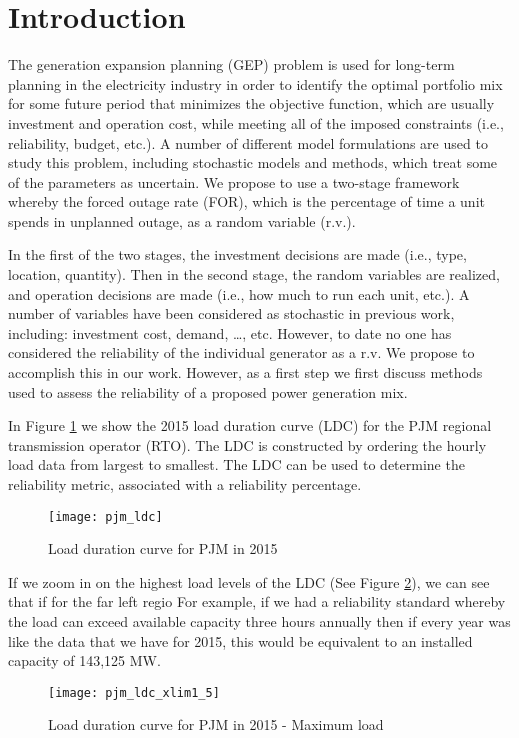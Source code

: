 \documentclass[10pt]{amsart}
\begin{document}
\section{Introduction}
The generation expansion planning (GEP) problem is used for long-term planning in the electricity industry in order to identify the optimal portfolio mix for some future period that minimizes the objective function, which are usually investment and operation cost, while meeting all of the imposed constraints (i.e., reliability, budget, etc.). 
A number of different model formulations are used to study this problem, including stochastic models and methods, which treat some of the parameters as uncertain.
We propose to use a two-stage framework whereby the forced outage rate (FOR), which is the percentage of time a unit spends in unplanned outage, as a random variable (r.v.). 

In the first of the two stages, the investment decisions are made (i.e., type, location, quantity).
Then in the second stage, the random variables are realized, and operation decisions are made (i.e., how much to run each unit, etc.). 
A number of variables have been considered as stochastic in previous work, including: investment cost, demand, \ldots, etc.
However, to date no one has considered the reliability of the individual generator as a r.v.
We propose to accomplish this in our work.
However, as a first step we first discuss methods used to assess the reliability of a proposed power generation mix.

In Figure \ref{figure:ldc} we show the 2015 load duration curve (LDC) for the PJM regional transmission operator (RTO). 
The LDC is constructed by ordering the hourly load data from largest to smallest.
The LDC can be used to determine the reliability metric, associated with a reliability percentage.

\begin{figure}[H]
\caption{Load duration curve for PJM in 2015}
\label{figure:ldc}
\centerline{\texttt{[image: pjm\_ldc]}}
\end{figure}

If we zoom in on the highest load levels of the LDC (See Figure \ref{figure:ldc1_5}), we can see that if for the far left regio
For example, if we had a reliability standard whereby the load can exceed available capacity three hours annually then if every year was like the data that we have for 2015, this would be equivalent to an installed capacity of 143,125 MW.

\begin{figure}[H]
\caption{Load duration curve for PJM in 2015 - Maximum load}
\label{figure:ldc1_5}
\centerline{\texttt{[image: pjm\_ldc\_xlim1\_5]}}
\end{figure}
\end{document}
